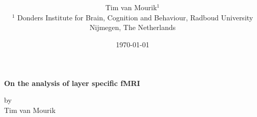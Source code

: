 \documentclass[11pt,fleqn]{book}
\title{\vspace{-15mm}\fontsize{24pt}{10pt}\selectfont\textbf{}} %
\author{
\large
{Tim van Mourik$^1$}\\[2mm] %
\small $^1$ Donders Institute for Brain, Cognition and Behaviour, Radboud University Nijmegen, The Netherlands\\ %
\vspace{-5mm}
}
\date{\today}
\begin{document}
\setlength{\parindent}{0.5cm}
\renewcommand{\vec}[1]{\mathbf{#1}} %


\begin{titlepage}
	\centering
	\vspace{1cm}
	\vspace{1.5cm}
	{\huge\bfseries On the analysis of layer specific fMRI \par}
	\vspace{4cm}
	{\Large by \\ Tim van Mourik\par}
	\vfill
\end{titlepage}








\end{document}
